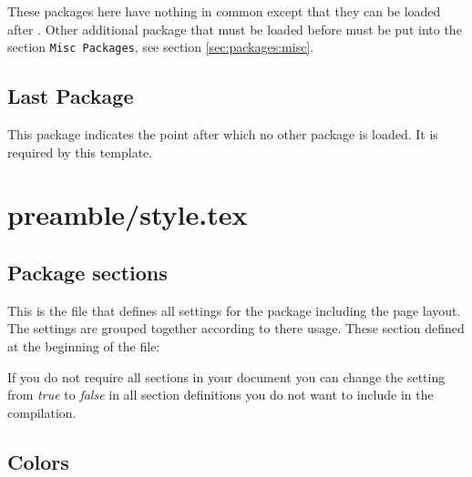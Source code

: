 These packages here have nothing in common except that they can be loaded after . Other additional package that must be loaded before must be put into the section \texttt{Misc Packages}, see section \cref{sec:packages:misc}.


\subsection{Last Package}
\label{sec:packages:last}

This package indicates the point after which no other package is loaded.
It is required by this template.



\section{preamble/style.tex}

\subsection{Package sections}
\label{sec:style:sections}

This is the file that defines all settings for the package including the page layout. The settings are grouped together according to there usage. 
These section defined at the beginning of the file:


If you do not require all sections in your document you can change the setting from \emph{true} to \emph{false} in all section definitions you do not want to include in the compilation.

\subsection{Colors}
\label{sec:style:colors}

